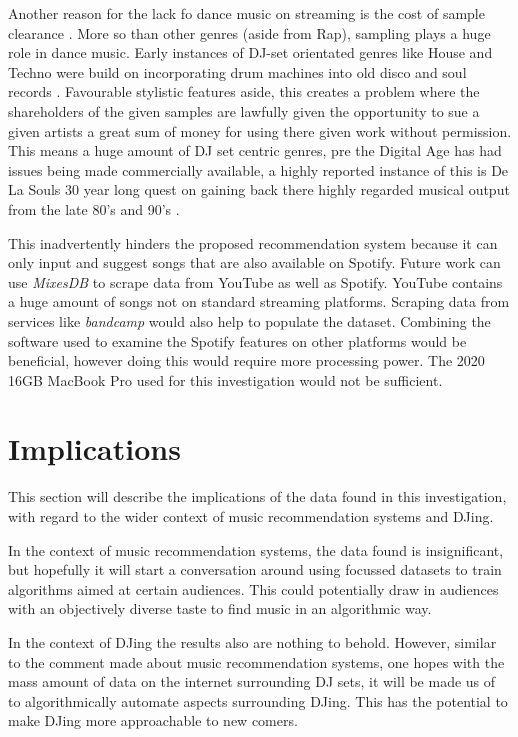 Another reason for the lack fo dance music on streaming is the cost of sample clearance \citep{morey_copyright_2013}. More so than other genres (aside from Rap), sampling plays a huge role in dance music. Early instances of DJ-set orientated genres like House and Techno were build on incorporating drum machines into old disco and soul records \citep{reynolds_energy_2013}. Favourable stylistic features aside, this creates a problem where the shareholders of the given samples are lawfully given the opportunity to sue a given artists a great sum of money for using there given work without permission. This means a huge amount of DJ set centric genres, pre the Digital Age has had issues being made commercially available, a highly reported instance of this is De La Souls 30 year long quest on gaining back there highly regarded musical output from the late 80's and 90's \citep{saunders_soul_2023}.

This inadvertently hinders the proposed recommendation system because it can only input and suggest songs that are also available on Spotify. Future work can use \textit{MixesDB} to scrape data from YouTube as well as Spotify. YouTube contains a huge amount of songs not on standard streaming platforms. Scraping data from services like \textit{bandcamp } would also help to populate the dataset. Combining the software used to examine the Spotify features on other platforms would be beneficial, however doing this would require more processing power. The 2020 16GB MacBook Pro used for this investigation would not be sufficient.



\section{Implications}
This section will describe the implications of the data found in this investigation, with regard to the
wider context of music recommendation systems and DJing.

In the context of music recommendation systems, the data found is insignificant, but hopefully it will start a conversation around using focussed datasets to train algorithms aimed at certain audiences. This could potentially draw in audiences with an objectively diverse taste to find music in an algorithmic way.

In the context of DJing the results also are nothing to behold. However, similar to the comment made about music recommendation systems, one hopes with the mass amount of data on the internet surrounding DJ sets, it will be made us of to algorithmically automate aspects surrounding DJing. This has the potential to make DJing more approachable to new comers. 


